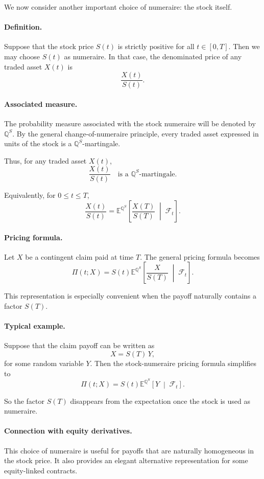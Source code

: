 \documentclass[11pt]{article}
\newcommand{\Qbb}{\mathbb{Q}}
\newcommand{\E}{\mathbb{E}}
\theoremstyle{definition}
\theoremstyle{plain}
\begin{document}
We now consider another important choice of numeraire: the stock itself.

\paragraph{Definition.}
Suppose that the stock price \(S(t)\) is strictly positive for all
\(t\in[0,T]\).
Then we may choose \(S(t)\) as numeraire.
In that case, the denominated price of any traded asset \(X(t)\) is
\[
\frac{X(t)}{S(t)}.
\]

\paragraph{Associated measure.}
The probability measure associated with the stock numeraire will be
denoted by \(\Qbb^S\).
By the general change-of-numeraire principle, every traded asset
expressed in units of the stock is a \(\Qbb^S\)-martingale.

Thus, for any traded asset \(X(t)\),
\[
\frac{X(t)}{S(t)}
\quad\text{is a }\Qbb^S\text{-martingale.}
\]

Equivalently, for \(0\le t\le T\),
\[
\frac{X(t)}{S(t)}
=
\E^{\Qbb^S}\!\left[
\frac{X(T)}{S(T)}
\;\middle|\;
\mathcal{F}_t
\right].
\]

\paragraph{Pricing formula.}
Let \(X\) be a contingent claim paid at time \(T\).
The general pricing formula becomes
\[
\Pi(t;X)
=
S(t)\E^{\Qbb^S}\!\left[
\frac{X}{S(T)}
\;\middle|\;
\mathcal{F}_t
\right].
\]

This representation is especially convenient when the payoff naturally
contains a factor \(S(T)\).

\paragraph{Typical example.}
Suppose that the claim payoff can be written as
\[
X=S(T)\,Y,
\]
for some random variable \(Y\).
Then the stock-numeraire pricing formula simplifies to
\[
\Pi(t;X)
=
S(t)\E^{\Qbb^S}\!\left[
Y
\;\middle|\;
\mathcal{F}_t
\right].
\]

So the factor \(S(T)\) disappears from the expectation once the stock is
used as numeraire.

\paragraph{Connection with equity derivatives.}
This choice of numeraire is useful for payoffs that are naturally
homogeneous in the stock price.
It also provides an elegant alternative representation for some
equity-linked contracts.
\end{document}
